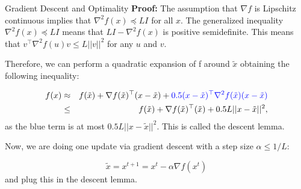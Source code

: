 		\begin{frame}{Gradient Descent and Optimality}
			\textbf{Proof: }
			The assumption that $\nabla f$ is Lipschitz continuous implies that $\nabla^2 f(x) \preccurlyeq L I$ for all $x$. The generalized inequality $\nabla^2 f(x) \preccurlyeq L I$ means that $L I - \nabla^2 f(x)$ is positive semidefinite. This means that $v^\top \nabla^2 f(u) v \leq L ||v||^2$ for any $u$ and $v$. 
			
			Therefore, we can perform a quadratic expansion of f around $\tilde{x}$ obtaining the following inequality: 

			\begin{eqnarray*}
				f(x) &\approx& f(\tilde{x}) + \nabla f(\tilde{x})^\top (x - \tilde{x}) + \textcolor{blue}{0.5  (x - \tilde{x})^\top \nabla^2 f(\tilde{x}) (x - \tilde{x})} \\
				& \leq & f(\tilde{x}) + \nabla f(\tilde{x})^\top (\tilde{x}) + 0.5 L ||x - \tilde{x}||^2,
			\end{eqnarray*}		
			as the blue term is at most $0.5 L ||x - \tilde{x}||^2$. This is called the descent lemma. 
			
			Now, we are doing one update via gradient descent with a step size $\alpha \leq 1/L$: 

			$$
			\tilde{x} = x^{t+1} = x^{t} - \alpha \nabla f(x^{t})
			$$ 
			and plug this in the descent lemma.
			

		\end{frame}
